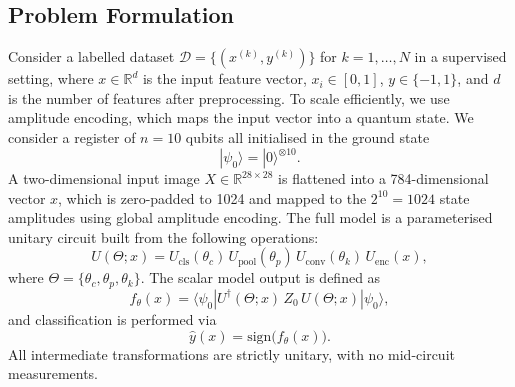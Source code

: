 \documentclass[conference]{IEEEtran}
\begin{document}
\subsection{Problem Formulation}
Consider a labelled dataset $\mathcal{D} = \{(x^{(k)}, y^{(k)})\}$ for $k = 1, \ldots, N$ in a supervised setting, where $x \in \mathbb{R}^d$ is the input feature vector, $x_i \in [0, 1]$, $y \in \{-1, 1\}$, and $d$ is the number of features after preprocessing. To scale efficiently, we use amplitude encoding, which maps the input vector into a quantum state. We consider a register of $n = 10$ qubits all initialised in the ground state
\begin{equation}
|\psi_0\rangle = |0\rangle^{\otimes 10}.
\end{equation}
A two-dimensional input image $X \in \mathbb{R}^{28 \times 28}$ is flattened into a 784-dimensional vector $x$, which is zero-padded to 1024 and mapped to the $2^{10} = 1024$ state amplitudes using global amplitude encoding. The full model is a parameterised unitary circuit built from the following operations:
\begin{equation}
U(\Theta; x) = U_{\text{cls}}(\theta_c)\, U_{\text{pool}}(\theta_p)\, U_{\text{conv}}(\theta_k)\, U_{\text{enc}}(x),
\end{equation}
where $\Theta = \{\theta_c, \theta_p, \theta_k\}$. The scalar model output is defined as
\begin{equation}
f_\theta(x) = \langle\psi_0|U^\dagger(\Theta; x)\, Z_0\, U(\Theta; x)|\psi_0\rangle,
\end{equation}
and classification is performed via
\begin{equation}
\hat{y}(x) = \text{sign}\big(f_\theta(x)\big).
\end{equation}
All intermediate transformations are strictly unitary, with no mid-circuit measurements.
\end{document}
